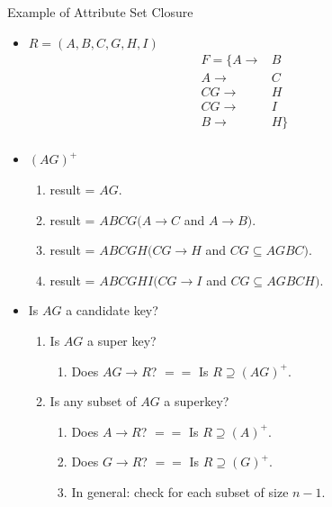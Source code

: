 \documentclass{beamer}
\begin{document}
\begin{frame}{Example of Attribute Set Closure}
    \footnotesize
    \begin{itemize}
        \item $R = (A, B, C, G, H, I)$
            \begin{equation*}
                \begin{align*}
                    F = \{  A   \rightarrow& B \\
                            A   \rightarrow& C \\
                            CG  \rightarrow& H \\
                            CG  \rightarrow& I \\
                            B   \rightarrow& H\} \\
                \end{align*}
            \end{equation*}
        \item $(AG)^+$
            \begin{enumerate}
                \item result = $AG$.
                \item result = $ABCG(A \rightarrow C$ and $A \rightarrow B)$.
                \item result = $ABCGH(CG \rightarrow H$ and $CG \subseteq AGBC)$.
                \item result = $ABCGHI(CG \rightarrow I$ and $CG \subseteq AGBCH)$.
            \end{enumerate}
        \item Is $AG$ a candidate key?
            \begin{enumerate}
                \item Is $AG$ a super key?
                    \begin{enumerate}
                        \item Does $AG \rightarrow R$? $==$ Is $R \supseteq (AG)^+$.
                    \end{enumerate}
                \item Is any subset of $AG$ a superkey?
                    \begin{enumerate}
                        \item Does $A \rightarrow R$? $==$ Is $R \supseteq (A)^+$.
                        \item Does $G \rightarrow R$? $==$ Is $R \supseteq (G)^+$.
                        \item In general: check for each subset of size $n-1$.
                    \end{enumerate}
            \end{enumerate}
    \end{itemize}
\end{frame}
\end{document}
